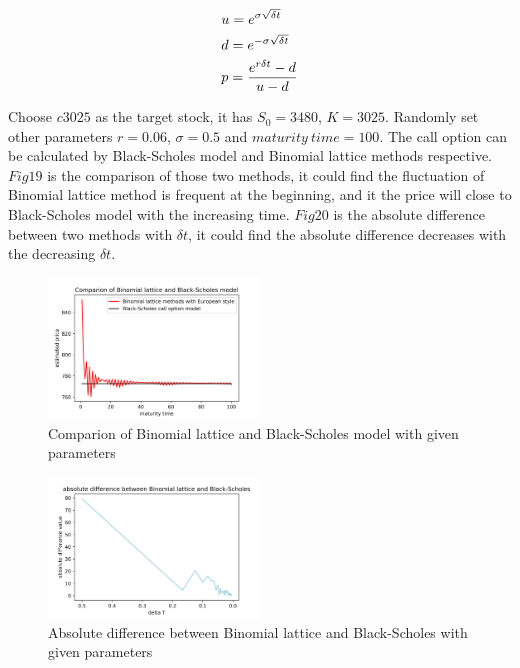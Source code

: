 \documentclass[sigconf]{acmart}
\begin{document}
\begin{equation} \label{eq46}
\setlength{\abovedisplayskip}{3pt}
\setlength{\belowdisplayskip}{9pt}
\begin{split}
&u = e^{\sigma \sqrt{\delta t}}\\
&d=e^{-\sigma \sqrt{\delta t}}\\
&p=\frac{e^{r\delta t}-d}{u-d}
\end{split}
\end{equation}

Choose $c3025$ as the target stock, it has $S_{0}=3480$, $K=3025$. Randomly set other parameters $r=0.06$, $\sigma=0.5$ and $maturity\ time = 100$. The call option can be calculated by Black-Scholes model and Binomial lattice methods respective. $Fig19$ is the comparison of those two methods, it could find the fluctuation of Binomial lattice method is frequent at the beginning, and it the price will close to Black-Scholes model with the increasing time. $Fig20$ is the absolute difference between two methods with $\delta t$, it could find the absolute difference decreases with the decreasing $\delta t$. ~\\

\begin{figure}[htbp]
    \centering
    \includegraphics[width=0.50\textwidth]{21.png}
    \caption{\label{}Comparion of Binomial lattice and Black-Scholes model with given parameters}
\end{figure}

\begin{figure}[htbp]
    \centering
    \includegraphics[width=0.50\textwidth]{22.png}
    \caption{\label{}Absolute difference between Binomial lattice and Black-Scholes with given parameters}
\end{figure}
\end{document}
